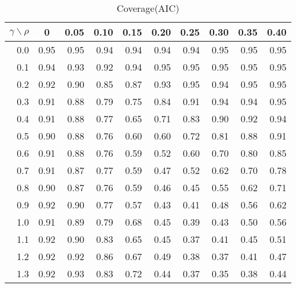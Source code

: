 \documentclass[12pt]{article}
\begin{document}
%
\begin{table}[!tbp]
\caption{Coverage(AIC)}
 \begin{center}
 \begin{tabular}{r|rrrrrrrrr}\hline\hline
\multicolumn{1}{c|}{$\gamma\backslash\rho$}&\multicolumn{1}{c}{0}&\multicolumn{1}{c}{0.05}&\multicolumn{1}{c}{0.10}&\multicolumn{1}{c}{0.15}&\multicolumn{1}{c}{0.20}&\multicolumn{1}{c}{0.25}&\multicolumn{1}{c}{0.30}&\multicolumn{1}{c}{0.35}&\multicolumn{1}{c}{0.40}\tabularnewline
\hline

0.0&0.95&0.95&0.94&0.94&0.94&0.94&0.95&0.95&0.95\tabularnewline
0.1&0.94&0.93&0.92&0.94&0.95&0.95&0.95&0.95&0.95\tabularnewline
0.2&0.92&0.90&0.85&0.87&0.93&0.95&0.94&0.95&0.95\tabularnewline
0.3&0.91&0.88&0.79&0.75&0.84&0.91&0.94&0.94&0.95\tabularnewline
0.4&0.91&0.88&0.77&0.65&0.71&0.83&0.90&0.92&0.94\tabularnewline
0.5&0.90&0.88&0.76&0.60&0.60&0.72&0.81&0.88&0.91\tabularnewline
0.6&0.91&0.88&0.76&0.59&0.52&0.60&0.70&0.80&0.85\tabularnewline
0.7&0.91&0.87&0.77&0.59&0.47&0.52&0.62&0.70&0.78\tabularnewline
0.8&0.90&0.87&0.76&0.59&0.46&0.45&0.55&0.62&0.71\tabularnewline
0.9&0.92&0.90&0.77&0.57&0.43&0.41&0.48&0.56&0.62\tabularnewline
1.0&0.91&0.89&0.79&0.68&0.45&0.39&0.43&0.50&0.56\tabularnewline
1.1&0.92&0.90&0.83&0.65&0.45&0.37&0.41&0.45&0.51\tabularnewline
1.2&0.92&0.92&0.86&0.67&0.49&0.38&0.37&0.41&0.47\tabularnewline
1.3&0.92&0.93&0.83&0.72&0.44&0.37&0.35&0.38&0.44\tabularnewline
\hline
\end{tabular}

\end{center}

\end{table}
\end{document}
